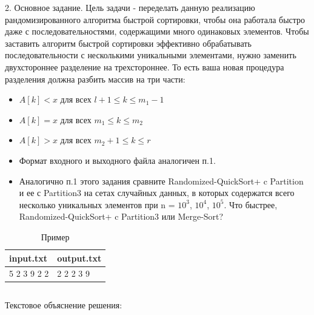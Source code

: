 2. Основное задание. Цель задачи - переделать данную реализацию рандомизированного алгоритма быстрой сортировки, чтобы она работала быстро даже с последовательностями, содержащими много одинаковых элементов. Чтобы заставить алгоритм быстрой сортировки эффективно обрабатывать последовательности с несколькими уникальными элементами, нужно заменить двухстороннее разделение на трехстороннее. То есть ваша новая процедура разделения должна разбить массив на три части:
\begin{itemize}
    \item $A[k] < x$ для всех $l + 1 \le k \le m_1 − 1$
    \item $A[k] = x$ для всех $m_1 \le  k \le m_2$
    \item $A[k] > x$ для всех $m_2 + 1 \le k \le r$
    \item Формат входного и выходного файла аналогичен п.1.
    \item Аналогично п.1 этого задания сравните Randomized-QuickSort+ c
    Partition и ее с Partition3 на сетах случайных данных, в которых
    содержатся всего несколько уникальных элементов при n = $10^3$, $10^4$, $10^5$. Что быстрее, Randomized-QuickSort+ c Partition3 или Merge-Sort?
\end{itemize}
\begin{table}[H]
    \caption{Пример}
	\begin{center}
		\begin{tabular}{|l|l|}
			\hline
			  input.txt  &  output.txt \\ \hline
			    5 2 3 9 2 2  &  2 2 2 3 9 \\ \hline
		\end{tabular}
		\label{tabular:tab_examp_2}
	\end{center}
\end{table}

\begin{code}
	\inputminted[breaklines=true, xleftmargin=1em, linenos, frame=single, framesep=10pt, fontsize=\footnotesize, firstline=1, lastline=54]{haskell}{listings/1.py}
	\caption{Код первой задачи}
\end{code}
Текстовое объяснение решения:


